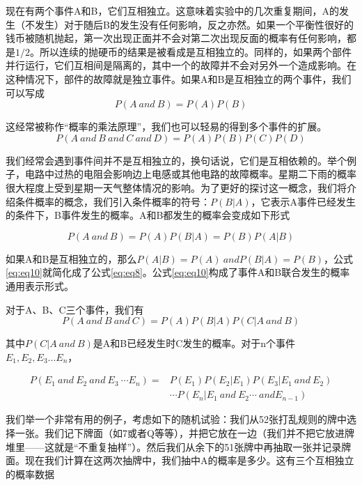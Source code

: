 \documentclass[cn,11pt,chinese]{elegantbook}
\begin{document}
现在有两个事件A和B，它们互相独立。这意味着实验中的几次重复期间，A的发生（不发生）对于随后B的发生没有任何影响，反之亦然。如果一个平衡性很好的钱币被随机抛起，第一次出现正面并不会对第二次出现反面的概率有任何影响，都是$1/2$。所以连续的抛硬币的结果是被看成是互相独立的。同样的，如果两个部件并行运行，它们互相间是隔离的，其中一个的故障并不会对另外一个造成影响。在这种情况下，部件的故障就是独立事件。如果A和B是互相独立的两个事件，我们可以写成
\begin{equation}
P(A \ and \ B)=P(A)P(B) \label{eq:eq8}
\end{equation}

这经常被称作“概率的乘法原理”，我们也可以轻易的得到多个事件的扩展。
\begin{equation} 
P(A \ and \ B \ and \  C \ and \ D)=P(A)P(B)P(C)P(D)
\label{eq:eq9}
\end{equation}

我们经常会遇到事件间并不是互相独立的，换句话说，它们是互相依赖的。举个例子，电路中过热的电阻会影响边上电感或其他电路的故障概率。星期二下雨的概率很大程度上受到星期一天气整体情况的影响。为了更好的探讨这一概念，我们将介绍条件概率的概念，我们引入条件概率的符号：$P(B|A)$，它表示A事件已经发生的条件下，B事件发生的概率。A和B都发生的概率会变成如下形式

\begin{equation} 
P(A \ and \ B)=P(A)P(B|A) = P(B)P(A|B)
\label{eq:eq10}
\end{equation}

如果A和B是互相独立的，那么$P(A|B)=P(A) \ and P(B|A) = P(B)$，公式\ref{eq:eq10}就简化成了公式\ref{eq:eq8}。公式\ref{eq:eq10}构成了事件A和B联合发生的概率通用表示形式。

对于A、B、C三个事件，我们有
\begin{equation}
P(A \ and \ B \ and \ C) = P(A)P(B|A)P(C|A \ and \ B) \label{eq:eq11}
\end{equation}

其中$P(C|A \ and \ B)$是A和B已经发生时C发生的概率。对于n个事件$E_1,E_2,E_3...E_n$，

\begin{align}
P(E_1 \ and \ E_2 \ and \ E_3 \ \cdots E_n) = & P(E_1)P(E_2|E_1)P(E_3|E_1 \ and \ E_2)  \nonumber \\
& \cdots P(E_n|E_1 \  and \ E_2 \cdots \ and E_{n-1})
 \label{eq:eq12}
\end{align}

我们举一个非常有用的例子，考虑如下的随机试验：我们从52张打乱规则的牌中选择一张。我们记下牌面（如7或者Q等等），并把它放在一边（我们并不把它放进牌堆里——这就是“不重复抽样”）。然后我们从余下的51张牌中再抽取一张并记录牌面。现在我们计算在这两次抽牌中，我们抽中A的概率是多少。这有三个互相独立的概率数据
\end{document}
